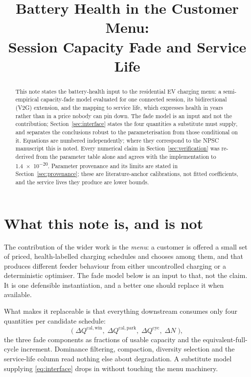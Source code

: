 \documentclass[11pt,a4paper]{article}
\title{Battery Health in the Customer Menu:\\
Session Capacity Fade and Service Life}
\author{}
\date{}
\newcommand{\dQ}{\Delta Q}
\begin{document}
\maketitle

\begin{abstract}
\noindent
This note states the battery-health input to the residential EV
charging menu: a semi-empirical capacity-fade model evaluated for one
connected session, its bidirectional (V2G) extension, and the mapping
to service life, which expresses health in years rather than in a
price nobody can pin down. The fade model is an input and not the
contribution; Section~\ref{sec:interface} states the four quantities
a substitute must supply, and separates the conclusions robust to the
parameterisation from those conditional on it. Equations are numbered independently; where they correspond to the
NPSC manuscript this is noted. Every numerical claim in
Section~\ref{sec:verification} was re-derived from the parameter table
alone and agrees with the implementation to \num{1.4e-20}. Parameter
provenance and its limits are stated in Section~\ref{sec:provenance};
these are literature-anchor calibrations, not fitted coefficients, and
the service lives they produce are lower bounds.
\end{abstract}

\section{What this note is, and is not}
\label{sec:interface}

The contribution of the wider work is the \emph{menu}: a customer is
offered a small set of priced, health-labelled charging schedules and
chooses among them, and that produces different feeder behaviour from
either uncontrolled charging or a deterministic optimiser. The fade
model below is an input to that, not the claim. It is one defensible
instantiation, and a better one should replace it when available.

What makes it replaceable is that everything downstream consumes only
four quantities per candidate schedule:
%
\begin{equation}
\bigl(\;
\dQ^{\mathrm{cal,win}},\;
\dQ^{\mathrm{cal,park}},\;
\dQ^{\mathrm{cyc}},\;
\Delta N
\;\bigr),
\label{eq:interface}
\end{equation}
%
the three fade components as fractions of usable capacity and the
equivalent-full-cycle increment. Dominance filtering, compaction,
diversity selection and the service-life column read nothing else
about degradation. A substitute model supplying \eqref{eq:interface}
drops in without touching the menu machinery.
\end{document}
